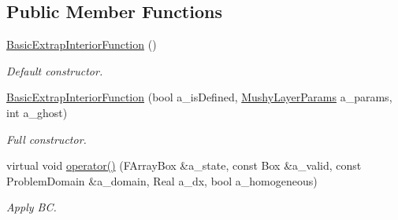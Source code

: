 \subsection*{Public Member Functions}
\begin{DoxyCompactItemize}
\item 
\hypertarget{class_basic_extrap_interior_function_a27c9cd01ac58476e1501d762d29a0b22}{\hyperlink{class_basic_extrap_interior_function_a27c9cd01ac58476e1501d762d29a0b22}{Basic\-Extrap\-Interior\-Function} ()}\label{class_basic_extrap_interior_function_a27c9cd01ac58476e1501d762d29a0b22}

\begin{DoxyCompactList}\small\item\em Default constructor. \end{DoxyCompactList}\item 
\hypertarget{class_basic_extrap_interior_function_a2b065fb8eac306deec75ae29512ea8fd}{\hyperlink{class_basic_extrap_interior_function_a2b065fb8eac306deec75ae29512ea8fd}{Basic\-Extrap\-Interior\-Function} (bool a\-\_\-is\-Defined, \hyperlink{class_mushy_layer_params}{Mushy\-Layer\-Params} a\-\_\-params, int a\-\_\-ghost)}\label{class_basic_extrap_interior_function_a2b065fb8eac306deec75ae29512ea8fd}

\begin{DoxyCompactList}\small\item\em Full constructor. \end{DoxyCompactList}\item 
\hypertarget{class_basic_extrap_interior_function_a67862d99ecbc2102bac335e28d7f39d4}{virtual void \hyperlink{class_basic_extrap_interior_function_a67862d99ecbc2102bac335e28d7f39d4}{operator()} (F\-Array\-Box \&a\-\_\-state, const Box \&a\-\_\-valid, const Problem\-Domain \&a\-\_\-domain, Real a\-\_\-dx, bool a\-\_\-homogeneous)}\label{class_basic_extrap_interior_function_a67862d99ecbc2102bac335e28d7f39d4}

\begin{DoxyCompactList}\small\item\em Apply B\-C. \end{DoxyCompactList}\end{DoxyCompactItemize}
